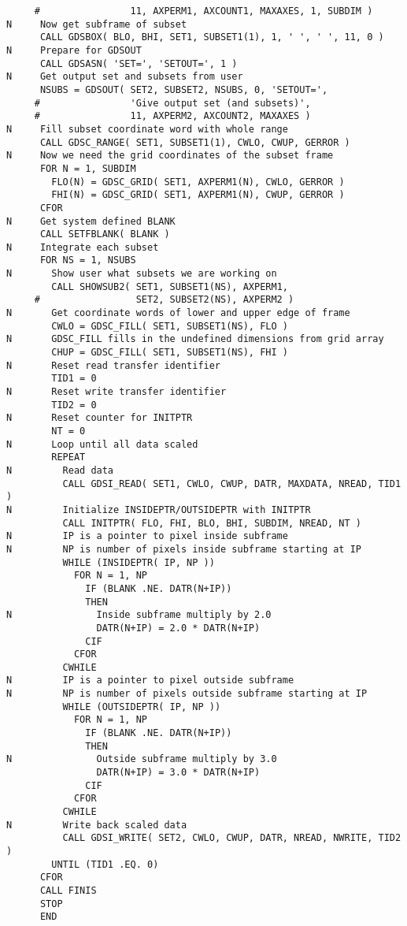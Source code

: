 \begin{verbatim}
     #                11, AXPERM1, AXCOUNT1, MAXAXES, 1, SUBDIM )
N     Now get subframe of subset
      CALL GDSBOX( BLO, BHI, SET1, SUBSET1(1), 1, ' ', ' ', 11, 0 )
N     Prepare for GDSOUT
      CALL GDSASN( 'SET=', 'SETOUT=', 1 )
N     Get output set and subsets from user
      NSUBS = GDSOUT( SET2, SUBSET2, NSUBS, 0, 'SETOUT=',
     #                'Give output set (and subsets)',
     #                11, AXPERM2, AXCOUNT2, MAXAXES )
N     Fill subset coordinate word with whole range
      CALL GDSC_RANGE( SET1, SUBSET1(1), CWLO, CWUP, GERROR )
N     Now we need the grid coordinates of the subset frame
      FOR N = 1, SUBDIM
        FLO(N) = GDSC_GRID( SET1, AXPERM1(N), CWLO, GERROR )
        FHI(N) = GDSC_GRID( SET1, AXPERM1(N), CWUP, GERROR )
      CFOR
N     Get system defined BLANK
      CALL SETFBLANK( BLANK )
N     Integrate each subset
      FOR NS = 1, NSUBS
N       Show user what subsets we are working on
        CALL SHOWSUB2( SET1, SUBSET1(NS), AXPERM1,
     #                 SET2, SUBSET2(NS), AXPERM2 )
N       Get coordinate words of lower and upper edge of frame
        CWLO = GDSC_FILL( SET1, SUBSET1(NS), FLO )
N       GDSC_FILL fills in the undefined dimensions from grid array
        CHUP = GDSC_FILL( SET1, SUBSET1(NS), FHI )
N       Reset read transfer identifier
        TID1 = 0
N       Reset write transfer identifier
        TID2 = 0
N       Reset counter for INITPTR
        NT = 0
N       Loop until all data scaled
        REPEAT
N         Read data
          CALL GDSI_READ( SET1, CWLO, CWUP, DATR, MAXDATA, NREAD, TID1 )
N         Initialize INSIDEPTR/OUTSIDEPTR with INITPTR
          CALL INITPTR( FLO, FHI, BLO, BHI, SUBDIM, NREAD, NT )
N         IP is a pointer to pixel inside subframe
N         NP is number of pixels inside subframe starting at IP
          WHILE (INSIDEPTR( IP, NP ))
            FOR N = 1, NP
              IF (BLANK .NE. DATR(N+IP))
              THEN
N               Inside subframe multiply by 2.0
                DATR(N+IP) = 2.0 * DATR(N+IP)
              CIF
            CFOR
          CWHILE
N         IP is a pointer to pixel outside subframe
N         NP is number of pixels outside subframe starting at IP
          WHILE (OUTSIDEPTR( IP, NP ))
            FOR N = 1, NP
              IF (BLANK .NE. DATR(N+IP))
              THEN
N               Outside subframe multiply by 3.0
                DATR(N+IP) = 3.0 * DATR(N+IP)
              CIF
            CFOR
          CWHILE
N         Write back scaled data
          CALL GDSI_WRITE( SET2, CWLO, CWUP, DATR, NREAD, NWRITE, TID2 )
        UNTIL (TID1 .EQ. 0)
      CFOR
      CALL FINIS
      STOP
      END
\end{verbatim}

